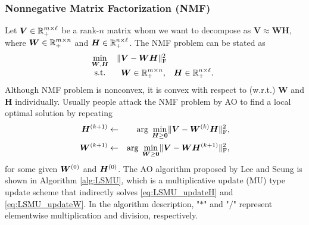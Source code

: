 \subsubsection{Nonnegative Matrix Factorization (NMF)}
Let $\bm V \in \mathbb R_+^{m \times \ell}$ be a rank-$n$ matrix whom we want to
decompose as $\bm V \approx \bm W \bm H$, where $\bm W \in \mathbb R_+^{m \times n}$
and $\bm H \in \mathbb R_+^{n \times \ell}$.
The NMF problem can be stated as
\begin{equation}
    \begin{array}{cl}
        \underset{\bm W,\bm H}{\min} &
        \Vert \bm V - \bm W \bm H \Vert_\text F^2 \\
        \text{s.t.} &
        \begin{array}{cc}
            \bm W \in \mathbb R_+^{m \times n}, &
            \bm H \in \mathbb R_+^{n \times \ell}.
        \end{array}
    \end{array}
    \label{eq:NMF}
\end{equation}
Although NMF problem is nonconvex, it is convex with respect to (w.r.t.)
$\bm W$ and $\bm H$ individually.
Usually people attack the NMF problem by AO to find a local optimal solution
by repeating
\begin{eqnarray}
    \bm H^{(k+1)}
    & \gets &
    \arg \; \underset{\bm H \geq \bm 0}{\min}
    \Vert \bm V - \bm W^{(k)} \bm H \Vert_\text F^2, \label{eq:LSMU_updateH}\\
    \bm W^{(k+1)}
    & \gets &
    \arg \; \underset{\bm W \geq \bm 0}{\min}
    \Vert \bm V - \bm W \bm H^{(k+1)} \Vert_\text F^2 \label{eq:LSMU_updateW},
\end{eqnarray}
for some given $\bm W^{(0)}$ and $\bm H^{(0)}$.
The AO algorithm proposed by Lee and Seung is shown in Algorithm
\ref{alg:LSMU}, which is a multiplicative update (MU) type update scheme that
indirectly solves \eqref{eq:LSMU_updateH} and \eqref{eq:LSMU_updateW}.
In the algorithm description, "$*$" and "$/$" represent elementwise
multiplication and division, respectively.

